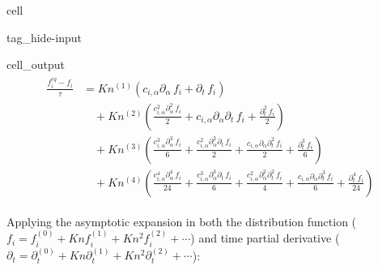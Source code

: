 \documentclass[letterpaper,10pt,english,openany,oneside]{jupyterBook}
\begin{document}
\begin{sphinxuseclass}{cell}
\begin{sphinxuseclass}{tag_hide-input}\begin{sphinxVerbatimOutput}

\begin{sphinxuseclass}{cell_output}\begin{equation*}
\begin{split}\displaystyle \begin{aligned}\frac{f_i^{eq} - f_{i}}{\tau} &= Kn^{(1)} \left(c_{i,\alpha} \partial_{\alpha}\,f_{i} + \partial_t\,f_{i}\right) \\[6pt] &\quad + Kn^{(2)} \left(\frac{c_{i,\alpha}^{2} \partial_{\alpha}^{2}\,f_{i}}{2} + c_{i,\alpha} \partial_{\alpha} \partial_t\,f_{i} + \frac{\partial_t^{2}\,f_{i}}{2}\right) \\[6pt] &\quad + Kn^{(3)} \left(\frac{c_{i,\alpha}^{3} \partial_{\alpha}^{3}\,f_{i}}{6} + \frac{c_{i,\alpha}^{2} \partial_{\alpha}^{2} \partial_t\,f_{i}}{2} + \frac{c_{i,\alpha} \partial_{\alpha} \partial_t^{2}\,f_{i}}{2} + \frac{\partial_t^{3}\,f_{i}}{6}\right) \\[6pt] &\quad + Kn^{(4)} \left(\frac{c_{i,\alpha}^{4} \partial_{\alpha}^{4}\,f_{i}}{24} + \frac{c_{i,\alpha}^{3} \partial_{\alpha}^{3} \partial_t\,f_{i}}{6} + \frac{c_{i,\alpha}^{2} \partial_{\alpha}^{2} \partial_t^{2}\,f_{i}}{4} + \frac{c_{i,\alpha} \partial_{\alpha} \partial_t^{3}\,f_{i}}{6} + \frac{\partial_t^{4}\,f_{i}}{24}\right)\end{aligned}\end{split}
\end{equation*}
\end{sphinxuseclass}\end{sphinxVerbatimOutput}

\end{sphinxuseclass}
\end{sphinxuseclass}
\sphinxAtStartPar
Applying the asymptotic expansion in both the distribution function (\(f_{i}=f_{i}^{(0)}+Kn f_{i}^{(1)} + Kn^{2} f_{i}^{(2)}+\cdots\)) and time partial derivative (\(\partial_{t}=\partial_{t}^{(0)}+ Kn \partial_{t}^{(1)}+Kn^{2} \partial_{t}^{(2)}+\cdots\)):
\end{document}
